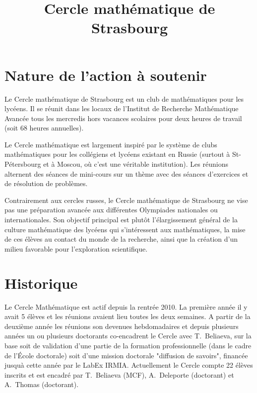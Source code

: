 \documentclass[11pt,notitlepage]{article}
\title{Cercle math\'ematique de Strasbourg}
\date{}
\begin{document}
\maketitle

\section{Nature de l'action \`a soutenir}
 
 Le Cercle math\'ematique de Strasbourg est un club de math\'ematiques pour les lyc\'eens. 
 Il se r\'eunit dans les locaux de l'Institut de Recherche Math\'ematique Avanc\'ee tous  les mercredis hors vacances scolaires pour deux heures de travail (soit 68 heures annuelles).
 
 Le Cercle math\'ematique est largement inspir\'e par le syst\`eme de
 clubs math\'ematiques pour les coll\'egiens et lyc\'eens existant en
 Russie (surtout \`a St-P\'etersbourg et \`a Moscou, o\`u c'est une  v\'eritable institution). Les r\'eunions alternent des s\'eances de mini-cours sur un th\`eme
 avec des s\'eances d'exercices et de r\'esolution de probl\`emes. 
 
 Contrairement aux cercles russes, le Cercle math\'ematique de
 Strasbourg ne vise pas une pr\'eparation avanc\'ee aux diff\'erentes
 Olympiades nationales ou internationales. Son objectif principal est
 plut\^ot l'\'elargissement g\'en\'eral de la culture math\'ematique des
 lyc\'eens qui s'int\'eressent aux math\'e\-matiques, la mise de ces
 \'el\`eves au contact du monde de la recherche, ainsi que la cr\'eation d'un milieu favorable pour l'exploration scientifique.
 

\section{Historique}
Le Cercle Math\'ematique est actif depuis la rentr\'ee 2010. La premi\`ere ann\'ee il y avait 5 \'el\`eves et les r\'eunions avaient lieu toutes les deux semaines. 
A partir de la deuxi\`eme ann\'ee les r\'eunions son devenues hebdomadaires et depuis plusieurs ann\'ees un ou plusieurs doctorants co-encadrent le Cercle avec T.~Beliaeva, 
sur la base soit de validation d'une partie de la formation professionnelle (dans le cadre de l'\'Ecole doctorale) soit d'une mission doctorale "diffusion de savoirs", 
financ\'ee jusqu\`a cette ann\'ee par le LabEx IRMIA. Actuellement le Cercle  compte 22 \'el\`eves inscrits et est encadr\'e par T.~Beliaeva (MCF), A.~Deleporte (doctorant) et A.~Thomas (doctorant).
\end{document}
